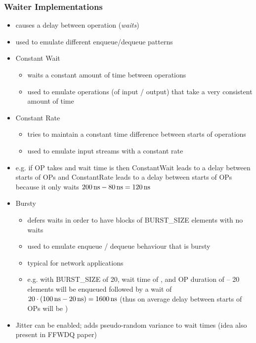 \subsubsection{Waiter Implementations}
\begin{itemize}
    \item causes a delay between operation (\textit{waits})
    \item used to emulate different enqueue/dequeue patterns
    \item Constant Wait
        \begin{itemize}
            \item waits a constant amount of time between operations
            \item used to emulate operations (of input / output) that take a very consistent amount of time
        \end{itemize}
    \item Constant Rate
        \begin{itemize}
            \item tries to maintain a constant time difference between starts of operations
            \item used to emulate input streams with a constant rate
        \end{itemize}
    \item e.g. if OP takes  and wait time is  then ConstantWait leads to a  delay
        between starts of OPs and ConstantRate leads to a  delay between starts of OPs because it
        only waits $\SI{200}{\nano\second}-\SI{80}{\nano\second}=\SI{120}{\nano\second}$
    \item Bursty
        \begin{itemize}
            \item defers waits in order to have blocks of BURST\_SIZE elements with no waits
            \item used to emulate enqueue / dequeue behaviour that is bursty
            \item typical for network applications
            \item e.g. with BURST\_SIZE of 20, wait time of , and OP duration of  -- 20
                elements will be enqueued followed by a wait of $20\cdot(\SI{100}{\nano\second} - \SI{20}{\nano\second}) = \SI{1600}{\nano\second}$ (thus on average delay between starts of OPs will be )
        \end{itemize}
    \item Jitter can be enabled; adds pseudo-random variance to wait times (idea also present in FFWDQ paper)
\end{itemize}

